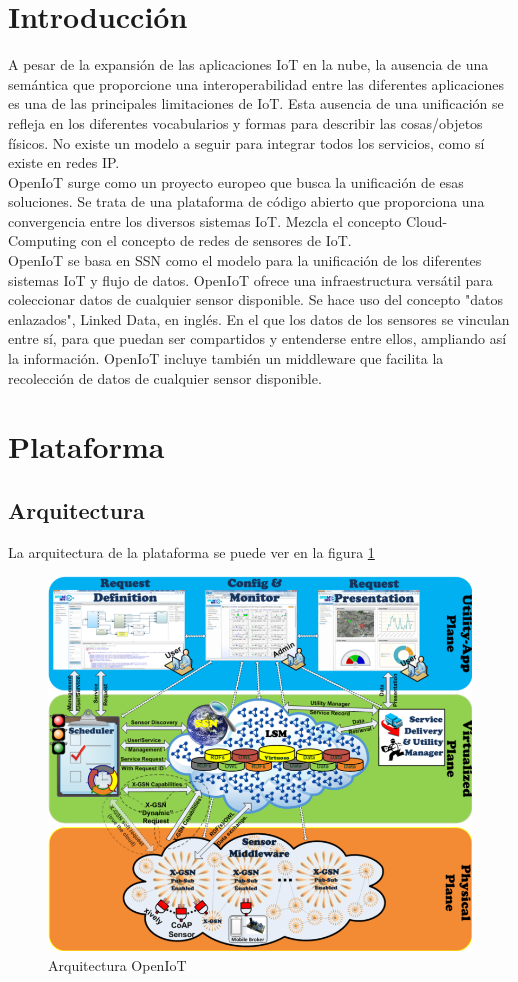 \documentclass[12pt, twoside]{book}
\begin{document}
\section{Introducción}
A pesar de la expansión de las aplicaciones IoT en la nube, la ausencia de una semántica que proporcione una interoperabilidad entre las diferentes aplicaciones es una de las principales limitaciones de IoT. Esta ausencia de una unificación se refleja en los diferentes vocabularios y formas para describir las cosas/objetos físicos. No existe un modelo a seguir para integrar todos los servicios, como sí existe en redes IP. \\

OpenIoT\cite{openiot}\cite{openiot_git}\cite{openiot_pdf} surge como un proyecto europeo que busca la unificación de esas soluciones. Se trata de una plataforma de código abierto que proporciona una convergencia entre los diversos sistemas IoT. Mezcla el concepto Cloud-Computing con el concepto de redes de sensores de IoT.\\ 

OpenIoT se basa en SSN como el modelo para la unificación de los diferentes sistemas IoT y flujo de datos. OpenIoT ofrece una infraestructura versátil para coleccionar datos de cualquier sensor disponible. Se hace uso del concepto "datos enlazados", Linked Data, en inglés. En el que los datos de los sensores se vinculan entre sí, para que puedan ser compartidos y entenderse entre ellos, ampliando así la información. OpenIoT incluye también un middleware que facilita la recolección de datos de cualquier sensor disponible.
\section{Plataforma}
\subsection{Arquitectura}
La arquitectura de la plataforma se puede ver en la figura \ref{L400} 
\begin{figure}[H]
\centering
\includegraphics[scale=0.4]{images/openiot_platform1}
\caption{Arquitectura OpenIoT}\label{L400}
\end{figure}
\end{document}
